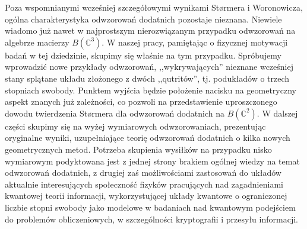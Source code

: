 Poza wspomnianymi wcześniej szczegółowymi wynikami St{\o}rmera i Woronowicza,
ogólna charakterystyka odwzorowań dodatnich pozostaje nieznana.
Niewiele wiadomo już nawet w najprostszym nierozwiązanym przypadku odwzorowań
na algebrze macierzy $B(\mathbb{C}^{3})$.
W naszej pracy,
pamiętając o fizycznej motywacji badań w tej dziedzinie,
skupimy się właśnie na tym przypadku.
Spróbujemy wprowadzić nowe przykłady odwzorowań,
,,wykrywających'' nieznane wcześniej stany splątane układu złożonego
z dwóch ,,qutritów'', tj. podukładów o trzech stopniach swobody.
Punktem wyjścia będzie położenie nacisku na geometryczny aspekt znanych
już zależności,
co pozwoli na przedstawienie uproszczonego dowodu twierdzenia St{\o}rmera
dla odwzorowań dodatnich na $B(\mathbb{C}^{2})$.
W dalszej części skupimy się na wyżej wymiarowych odwzorowaniach,
prezentując oryginalne wyniki,
uzupełniające teorię odwzorowań dodatnich o kilka nowych geometrycznych metod.
Potrzeba skupienia wysiłków na przypadku nisko wymiarowym podyktowana jest
z jednej strony brakiem ogólnej wiedzy na temat odwzorowań dodatnich,
z drugiej zaś możliwościami zastosowań do układów aktualnie interesujących
społeczność fizyków pracujących nad zagadnieniami kwantowej teorii informacji,
wykorzystującej układy kwantowe o ograniczonej liczbie stopni swobody
jako modelowe w badaniach nad kwantowym podejściem do problemów obliczeniowych,
w szczególności kryptografii i przesyłu informacji.

